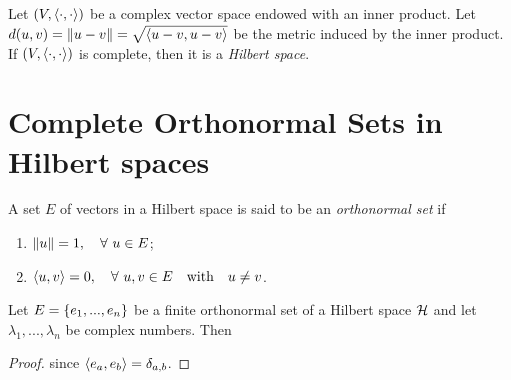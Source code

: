 \documentclass[oneside, 10pt, notitlepage]{book}
\begin{document}
\begin{definition}
	Let \((V,\left\langle \cdot,\cdot \right\rangle)\) be a complex vector space endowed with an inner product. Let \(d(u,v)=\norm{u-v}=\sqrt{\left\langle u-v,u-v \right\rangle}\) be the metric induced by the inner product. If \((V,\left\langle \cdot,\cdot \right\rangle)\) is complete, then it is a \emph{Hilbert space}.
\end{definition}




\section{Complete Orthonormal Sets in Hilbert spaces}

\begin{definition}
	A set \(E\) of vectors in a Hilbert space is said to be an \emph{orthonormal set} if
	\begin{enumerate}
		\item \(\norm{u}=1 \qcomma \forall\ u\in E\);
		\item \(\inner{u}{v}=0 \qcomma \forall\ u,v \in E \qq{with} u\neq v\).
	\end{enumerate}
\end{definition}



\begin{proposition}
	Let \(E = \left\{e_1,...,e_n\right\}\) be a finite orthonormal set of a Hilbert space \(\mathcal{H}\) and let \(\lambda_1,...,\lambda_n\) be complex numbers. Then
\end{proposition}
\begin{proof}
	since \(\left\langle e_a,e_b \right\rangle = \delta_{a,b}\).
\end{proof}

\end{document}
